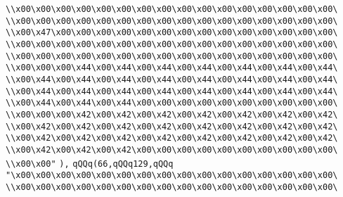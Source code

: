 \verb|\\x00\x00\x00\x00\x00\x00\x00\x00\x00\x00\x00\x00\x00\x00\x00\x00\|\newline
\verb|\\x00\x00\x00\x00\x00\x00\x00\x00\x00\x00\x00\x00\x00\x00\x00\x00\|\newline
\verb|\\x00\x47\x00\x00\x00\x00\x00\x00\x00\x00\x00\x00\x00\x00\x00\x00\|\newline
\verb|\\x00\x00\x00\x00\x00\x00\x00\x00\x00\x00\x00\x00\x00\x00\x00\x00\|\newline
\verb|\\x00\x00\x00\x00\x00\x00\x00\x00\x00\x00\x00\x00\x00\x00\x00\x00\|\newline
\verb|\\x00\x00\x00\x44\x00\x44\x00\x44\x00\x44\x00\x44\x00\x44\x00\x44\|\newline
\verb|\\x00\x44\x00\x44\x00\x44\x00\x44\x00\x44\x00\x44\x00\x44\x00\x44\|\newline
\verb|\\x00\x44\x00\x44\x00\x44\x00\x44\x00\x44\x00\x44\x00\x44\x00\x44\|\newline
\verb|\\x00\x44\x00\x44\x00\x44\x00\x00\x00\x00\x00\x00\x00\x00\x00\x00\|\newline
\verb|\\x00\x00\x00\x42\x00\x42\x00\x42\x00\x42\x00\x42\x00\x42\x00\x42\|\newline
\verb|\\x00\x42\x00\x42\x00\x42\x00\x42\x00\x42\x00\x42\x00\x42\x00\x42\|\newline
\verb|\\x00\x42\x00\x42\x00\x42\x00\x42\x00\x42\x00\x42\x00\x42\x00\x42\|\newline
\verb|\\x00\x42\x00\x42\x00\x42\x00\x00\x00\x00\x00\x00\x00\x00\x00\x00\|\newline
\verb|\\x00\x00"|\newline
\verb|),|\newline
\verb|qQQq(66,qQQq129,qQQq|\newline
\verb|"\x00\x00\x00\x00\x00\x00\x00\x00\x00\x00\x00\x00\x00\x00\x00\x00\|\newline
\verb|\\x00\x00\x00\x00\x00\x00\x00\x00\x00\x00\x00\x00\x00\x00\x00\x00\|\newline
